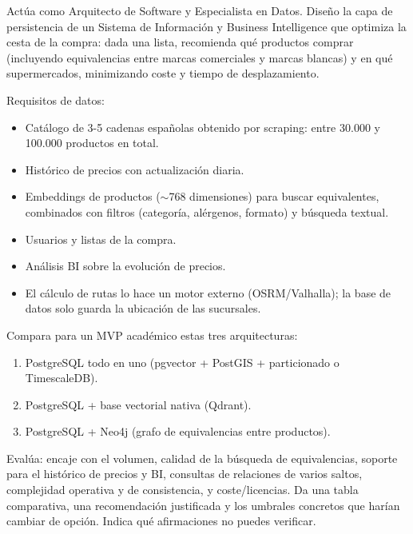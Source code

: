 \begin{tcolorbox}[colback=promptcolor, title=Prompt Introducido, colframe=blue!50!black, breakable]
	Actúa como Arquitecto de Software y Especialista en Datos. Diseño la capa de persistencia de un Sistema de Información y Business Intelligence que optimiza la cesta de la compra: dada una lista, recomienda qué productos comprar (incluyendo equivalencias entre marcas comerciales y marcas blancas) y en qué supermercados, minimizando coste y tiempo de desplazamiento.

	Requisitos de datos:
	\begin{itemize}
		\item Catálogo de 3-5 cadenas españolas obtenido por scraping: entre 30.000 y 100.000 productos en total.
		\item Histórico de precios con actualización diaria.
		\item Embeddings de productos ($\sim$768 dimensiones) para buscar equivalentes, combinados con filtros (categoría, alérgenos, formato) y búsqueda textual.
		\item Usuarios y listas de la compra.
		\item Análisis BI sobre la evolución de precios.
		\item El cálculo de rutas lo hace un motor externo (OSRM/Valhalla); la base de datos solo guarda la ubicación de las sucursales.
	\end{itemize}

	Compara para un MVP académico estas tres arquitecturas:
	\begin{enumerate}[label=\Alph*)]
		\item PostgreSQL todo en uno (pgvector + PostGIS + particionado o TimescaleDB).
		\item PostgreSQL + base vectorial nativa (Qdrant).
		\item PostgreSQL + Neo4j (grafo de equivalencias entre productos).
	\end{enumerate}

	Evalúa: encaje con el volumen, calidad de la búsqueda de equivalencias, soporte para el histórico de precios y BI, consultas de relaciones de varios saltos, complejidad operativa y de consistencia, y coste/licencias. Da una tabla comparativa, una recomendación justificada y los umbrales concretos que harían cambiar de opción. Indica qué afirmaciones no puedes verificar.
\end{tcolorbox}

